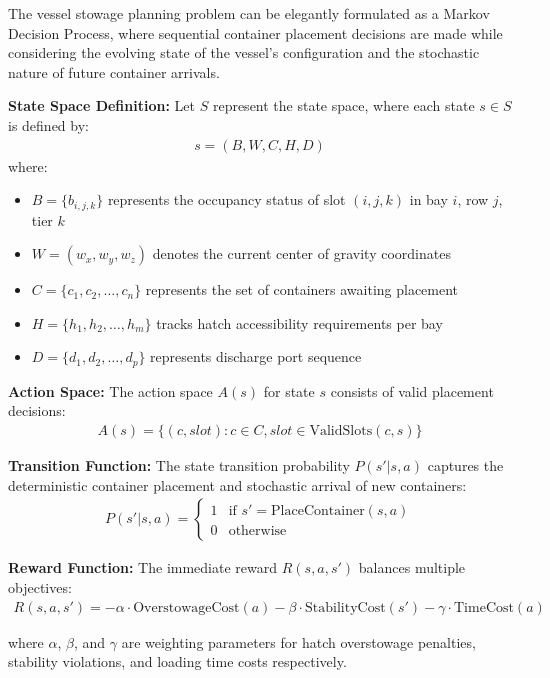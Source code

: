 \documentclass{article}
\begin{document}
The vessel stowage planning problem can be elegantly formulated as a Markov Decision Process, where sequential container placement decisions are made while considering the evolving state of the vessel's configuration and the stochastic nature of future container arrivals.

\textbf{State Space Definition:}
Let $S$ represent the state space, where each state $s \in S$ is defined by:
\begin{align}
s = (B, W, C, H, D)
\end{align}
where:
\begin{itemize}
\item $B = \{b_{i,j,k}\}$ represents the occupancy status of slot $(i,j,k)$ in bay $i$, row $j$, tier $k$
\item $W = (w_x, w_y, w_z)$ denotes the current center of gravity coordinates
\item $C = \{c_1, c_2, \ldots, c_n\}$ represents the set of containers awaiting placement
\item $H = \{h_1, h_2, \ldots, h_m\}$ tracks hatch accessibility requirements per bay
\item $D = \{d_1, d_2, \ldots, d_p\}$ represents discharge port sequence
\end{itemize}

\textbf{Action Space:}
The action space $A(s)$ for state $s$ consists of valid placement decisions:
\begin{align}
A(s) = \{(c, slot) : c \in C, slot \in \text{ValidSlots}(c, s)\}
\end{align}

\textbf{Transition Function:}
The state transition probability $P(s'|s,a)$ captures the deterministic container placement and stochastic arrival of new containers:
\begin{align}
P(s'|s,a) = \begin{cases}
1 & \text{if } s' = \text{PlaceContainer}(s,a) \\
0 & \text{otherwise}
\end{cases}
\end{align}

\textbf{Reward Function:}
The immediate reward $R(s,a,s')$ balances multiple objectives:
\begin{align}
R(s,a,s') = -\alpha \cdot \text{OverstowageCost}(a) - \beta \cdot \text{StabilityCost}(s') - \gamma \cdot \text{TimeCost}(a)
\end{align}

where $\alpha$, $\beta$, and $\gamma$ are weighting parameters for hatch overstowage penalties, stability violations, and loading time costs respectively.
\end{document}
